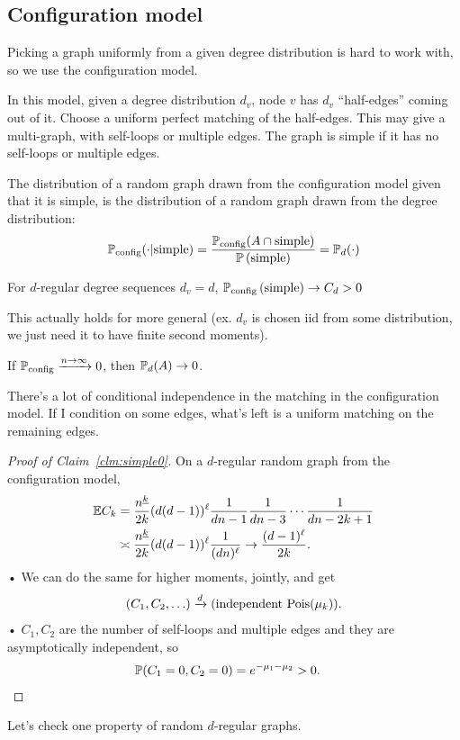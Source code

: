 \subsection{Configuration model}
Picking a graph uniformly from a given degree distribution is hard to work with, so we use the configuration model.

In this model, given a degree distribution $d_v$, node $v$ has $d_v$ ``half-edges'' coming out of it. Choose a uniform perfect matching of the half-edges. This may give a multi-graph, with self-loops or multiple edges. The graph is simple if it has no self-loops or multiple edges.

\begin{lem}
The distribution of a random graph drawn from the configuration model given that it is simple, is the distribution of a random graph drawn from the degree distribution:
\begin{align}
\mathbb{P}_{\text{config}} (\cdot | \text{simple}) =\frac{\mathbb{P}_{\text{config}}(A\cap \text{simple})}{\mathbb{P}\left( \text{simple} \right)} =  \mathbb{P}_d(\cdot)
\end{align}
\end{lem}

\begin{clm}\label{clm:simple0}
For $d$-regular degree sequences $d_v=d$, $\mathbb{P}_{\text{config}}\left( \text{simple} \right)\to C_d>0$
\end{clm}
This actually holds for more general (ex. $d_v$ is chosen iid from some distribution, we just need it to have finite second moments).
\begin{cor}\label{cor:config0}
If $\mathbb{P}_{\text{config}}\xrightarrow{n\to \infty}0$, then $\mathbb{P}_d(A)\to 0$.
\end{cor}

There's a lot of conditional independence in the matching in the configuration model.
If I condition on some edges, what's left is a uniform matching on the remaining edges.

\begin{proof}[Proof of Claim~\ref{clm:simple0}]
On a $d$-regular random graph from the configuration model,
\begin{align}
\mathbb{E} C_k &= \frac{n^{\underline{k}}}{2k} (d(d-1))^\ell \frac{1}{dn-1}\frac{1}{dn-3}\cdots \frac{1}{dn-2k+1}\\
&\asymp \frac{n^{\underline{k}}}{2k} (d(d-1))^\ell \frac{1}{(dn)^\ell}
\to \frac{(d-1)^\ell}{2k}.
\end{align}•
We can do the same for higher moments, jointly, and get
\begin{align}
(C_1,C_2,\ldots ) \xrightarrow{d} (\text{independent }\text{Pois}(\mu_k)).
\end{align}•
$C_1,C_2$ are the number of self-loops and multiple edges and they are asymptotically independent, so 
\begin{align}
\mathbb{P}(C_1=0,C_2=0)&=e^{-\mu_1-\mu_2}>0.
\end{align}
\end{proof}
Let's check one property of random $d$-regular graphs.

